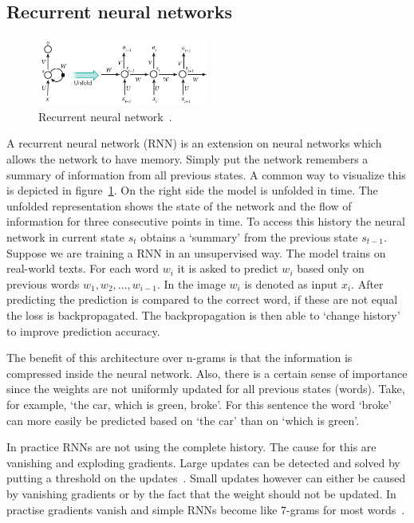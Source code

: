\subsection{Recurrent neural networks}
\label{subsec:rnn}
\begin{figure}[htbp]
    \begin{center}
        \includegraphics[width=0.5\textwidth]{figures/rnn.jpg}
    \end{center}
    \caption{Recurrent neural network~\cite[Figure 5]{lecun2015deep}.}
    \label{fig:rnn}
\end{figure}
A recurrent neural network (RNN) is an extension on neural networks which allows the network to have memory.
Simply put the network remembers a summary of information from all previous states.
A common way to visualize this is depicted in figure~\ref{fig:rnn}.
On the right side the model is unfolded in time.
The unfolded representation shows the state of the network and the flow of information for three consecutive points in time.
To access this history the neural network in current state $s_t$ obtains a `summary' from the previous state $s_{t-1}$.
Suppose we are training a RNN in an unsupervised way.
The model trains on real-world texts.
For each word $w_i$ it is asked to predict $w_i$ based only on previous words $w_1, w_2, \ldots, w_{i-1}$.
In the image $w_i$ is denoted as input $x_i$.
After predicting the prediction is compared to the correct word, if these are not equal the loss is backpropagated.
The backpropagation is then able to `change history' to improve prediction accuracy.

The benefit of this architecture over n-grams is that the information is compressed inside the neural network.
Also, there is a certain sense of importance since the weights are not uniformly updated for all previous states (words).
Take, for example, `the car, which is green, broke'.
For this sentence the word `broke' can more easily be predicted based on `the car' than on `which is green'.

In practice RNNs are not using the complete history.
The cause for this are vanishing and exploding gradients.
Large updates can be detected and solved by putting a threshold on the updates~\citep{mikolov2014learning}.
Small updates however can either be caused by vanishing gradients or by the fact that the weight should not be updated.
In practise gradients vanish and simple RNNs become like 7-grams for most words~\citep{manning2017lectures}.


